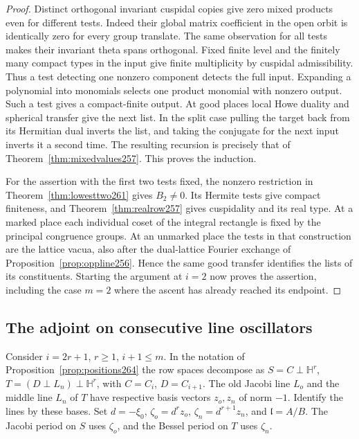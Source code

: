 \documentclass[a4paper,11pt]{article}
\theoremstyle{definition}
\theoremstyle{remark}
\numberwithin{equation}{section}
\begin{document}
\begin{proof}
Distinct orthogonal invariant cuspidal copies give zero mixed
products even for different tests. Indeed their global matrix
coefficient in the open orbit is identically zero for every
group translate. The same observation for all tests makes
their invariant theta spans orthogonal. Fixed finite level
and the finitely many compact types in the input give finite
multiplicity by cuspidal admissibility. Thus a test detecting
one nonzero component detects the full input. Expanding a
polynomial into monomials selects one product monomial with
nonzero output. Such a test gives a compact-finite output.
At good places local Howe duality and spherical transfer give
the next list. In the split case pulling the target back from
its Hermitian dual inverts the list, and taking the conjugate
for the next input inverts it a second time. The resulting
recursion is precisely that of Theorem~\ref{thm:mixedvalues257}.
This proves the induction.

For the assertion with the first two tests fixed, the nonzero
restriction in Theorem~\ref{thm:lowesttwo261} gives \(B_2\ne0\).
Its Hermite tests give compact finiteness, and
Theorem~\ref{thm:realrow257} gives cuspidality and its real type.
At a marked place each individual coset of the integral
rectangle is fixed by the principal congruence groups. At an
unmarked place the tests in that construction are the lattice
vacua, also after the dual-lattice Fourier exchange of
Proposition~\ref{prop:oppline256}. Hence the same good transfer
identifies the lists of its constituents. Starting the argument
at \(i=2\) now proves the assertion, including the case \(m=2\)
where the ascent has already reached its endpoint.
\end{proof}

\subsection{The adjoint on consecutive line oscillators}\label{nav:V-39}
Consider \(i=2r+1\), \(r\ge1\), \(i+1\le m\). In the notation
of Proposition~\ref{prop:positions264} the row spaces decompose
as \(S=C\perp\mathbb H^r\),
\(T=(D\perp L_n)\perp\mathbb H^r\), with
\(C=C_i\), \(D=C_{i+1}\). The old Jacobi line \(L_o\) and
the middle line \(L_n\) of \(T\) have respective basis vectors
\(z_o,z_n\) of norm \(-1\). Identify the lines by these bases.
Set \(d=-\xi_0\), \(\zeta_o=d^r z_o\), \(\zeta_n=d^{r+1}z_n\),
and \(\mathfrak l=A/B\). The Jacobi period on \(S\) uses
\(\zeta_o\), and the Bessel period on \(T\) uses \(\zeta_n\).
\end{document}
